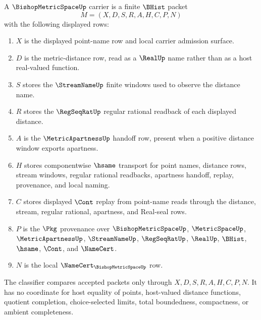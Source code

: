 \begin{definition}
\label{def:bishop-metric-space-carrier}
A $\BishopMetricSpaceUp$ carrier is a finite $\BHist$ packet
$$
M=(X,D,S,R,A,H,C,P,N)
$$
with the following displayed rows:
\begin{enumerate}
\item $X$ is the displayed point-name row and local carrier admission surface.
\item $D$ is the metric-distance row, read as a $\RealUp$ name rather than as a host real-valued function.
\item $S$ stores the $\StreamNameUp$ finite windows used to observe the distance name.
\item $R$ stores the $\RegSeqRatUp$ regular rational readback of each displayed distance.
\item $A$ is the $\MetricApartnessUp$ handoff row, present when a positive distance window exports apartness.
\item $H$ stores componentwise $\hsame$ transport for point names, distance rows, stream windows, regular rational readbacks, apartness handoff, replay, provenance, and local naming.
\item $C$ stores displayed $\Cont$ replay from point-name reads through the distance, stream, regular rational, apartness, and Real-seal rows.
\item $P$ is the $\Pkg$ provenance over $\BishopMetricSpaceUp$, $\MetricSpaceUp$, $\MetricApartnessUp$, $\StreamNameUp$, $\RegSeqRatUp$, $\RealUp$, $\BHist$, $\hsame$, $\Cont$, and $\NameCert$.
\item $N$ is the local $\NameCert_{\BishopMetricSpaceUp}$ row.
\end{enumerate}
The classifier compares accepted packets only through $X,D,S,R,A,H,C,P,N$. It has no coordinate for host equality of points, host-valued distance functions, quotient completion, choice-selected limits, total boundedness, compactness, or ambient completeness.
\end{definition}

